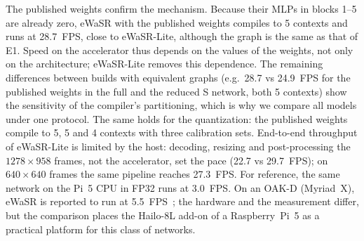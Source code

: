 \documentclass[conference]{IEEEtran}
\begin{document}
The published weights confirm the mechanism. Because their MLPs in blocks 1--5 are already zero, eWaSR with the published weights compiles to 5 contexts and runs at 28.7~FPS, close to eWaSR-Lite, although the graph is the same as that of E1. Speed on the accelerator thus depends on the values of the weights, not only on the architecture; eWaSR-Lite removes this dependence. The remaining differences between builds with equivalent graphs (e.g.\ 28.7 vs 24.9~FPS for the published weights in the full and the reduced S network, both 5 contexts) show the sensitivity of the compiler's partitioning, which is why we compare all models under one protocol. The same holds for the quantization: the published weights compile to 5, 5 and 4 contexts with three calibration sets. End-to-end throughput of eWaSR-Lite is limited by the host: decoding, resizing and post-processing the $1278\times958$ frames, not the accelerator, set the pace (22.7 vs 29.7~FPS); on $640\times640$ frames the same pipeline reaches 27.3~FPS. For reference, the same network on the Pi~5 CPU in FP32 runs at 3.0~FPS. On an OAK-D (Myriad~X), eWaSR is reported to run at 5.5~FPS~\cite{tersek2023ewasr}; the hardware and the measurement differ, but the comparison places the Hailo-8L add-on of a Raspberry~Pi~5 as a practical platform for this class of networks.
\end{document}
